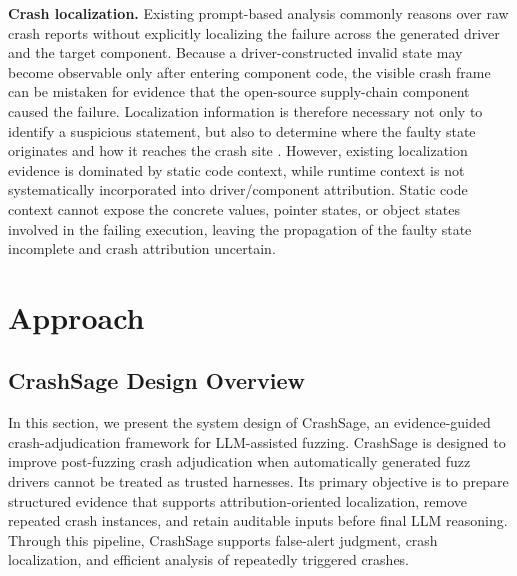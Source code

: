 \documentclass[pdflatex,sn-basic]{sn-jnl}%
\theoremstyle{thmstyleone}%
\theoremstyle{thmstyletwo}%
\theoremstyle{thmstylethree}%
\begin{document}
\textbf{Crash localization.} Existing prompt-based analysis commonly reasons over raw crash reports without explicitly localizing the failure across the generated driver and the target component. Because a driver-constructed invalid state may become observable only after entering component code, the visible crash frame can be mistaken for evidence that the open-source supply-chain component caused the failure. Localization information is therefore necessary not only to identify a suspicious statement, but also to determine where the faulty state originates and how it reaches the crash site \citep{ref14,ref15,ref20,ref23}. However, existing localization evidence is dominated by static code context, while runtime context is not systematically incorporated into driver/component attribution. Static code context cannot expose the concrete values, pointer states, or object states involved in the failing execution, leaving the propagation of the faulty state incomplete and crash attribution uncertain.


\section{Approach}
\label{sec:approach}

\subsection{CrashSage Design Overview}
\label{subsec:problem-overview}

In this section, we present the system design of CrashSage, an evidence-guided crash-adjudication framework for LLM-assisted fuzzing. CrashSage is designed to improve post-fuzzing crash adjudication when automatically generated fuzz drivers cannot be treated as trusted harnesses. Its primary objective is to prepare structured evidence that supports attribution-oriented localization, remove repeated crash instances, and retain auditable inputs before final LLM reasoning. Through this pipeline, CrashSage supports false-alert judgment, crash localization, and efficient analysis of repeatedly triggered crashes.
\end{document}
